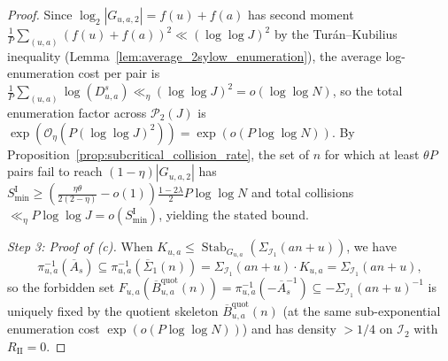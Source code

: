 \documentclass[11pt, a4paper]{article}
\theoremstyle{plain}
\theoremstyle{definition}
\begin{document}
\begin{proof}
Since $\log_2|G_{u,a,2}|=f(u)+f(a)$ has second moment $\frac1P\sum_{(u,a)}(f(u)+f(a))^{2}\ll(\log\log J)^{2}$ by the Tur\'{a}n--Kubilius inequality (Lemma~\ref{lem:average_2sylow_enumeration}), the average log-enumeration cost per pair is $\frac1P\sum_{(u,a)}\log(D_{u,a}^{s})\ll_\eta(\log\log J)^{2}=o(\log\log N)$, so the total enumeration factor across $\mathcal{P}_2(J)$ is $\exp(\mathcal{O}_\eta(P(\log\log J)^{2}))=\exp(o(P\log\log N))$. By Proposition~\ref{prop:subcritical_collision_rate}, the set of $n$ for which at least $\theta P$ pairs fail to reach $(1-\eta)|G_{u,a,2}|$ has $S_{\min}^{\mathrm{I}}\ge(\frac{\eta\theta}{2(2-\eta)}-o(1))\frac{1-2\lambda}{2}P\log\log N$ and total collisions $\ll_\eta P\log\log J=o(S_{\min}^{\mathrm{I}})$, yielding the stated bound.

\medskip\noindent\emph{Step 3: Proof of (c).}
When $K_{u,a}\le\operatorname{Stab}_{G_{u,a}}(\Sigma_{\mathcal{I}_1}(an+u))$, we have 
\[
\pi_{u,a}^{-1}(\overline{A}_s)\subseteq\pi_{u,a}^{-1}(\overline{\Sigma}_1(n))=\Sigma_{\mathcal{I}_1}(an+u)\cdot K_{u,a}=\Sigma_{\mathcal{I}_1}(an+u),
\]
so the forbidden set $F_{u,a}(\overline{B}_{u,a}^{\mathrm{quot}}(n))=\pi_{u,a}^{-1}(-\overline{A}_s^{-1})\subseteq-\Sigma_{\mathcal{I}_1}(an+u)^{-1}$ is uniquely fixed by the quotient skeleton $\overline{B}_{u,a}^{\mathrm{quot}}(n)$ (at the same sub-exponential enumeration cost $\exp(o(P\log\log N))$) and has density $>1/4$ on $\mathcal{I}_2$ with $R_{\mathrm{II}}=0$.
\end{proof}
\end{document}

